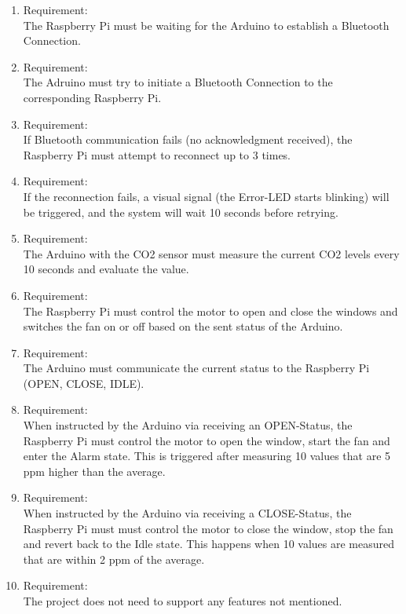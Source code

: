     \begin{enumerate}[label*=\arabic*.]
        \item \label{qreq.1}  Requirement:  \\
        The Raspberry Pi must be waiting for the Arduino to establish a Bluetooth Connection. \\ 
        \item \label{qreq.2}  Requirement:  \\
        The Adruino must try to initiate a Bluetooth Connection to the corresponding Raspberry Pi. \\ 
        \item \label{qreq.3}  Requirement:  \\
        If Bluetooth communication fails (no acknowledgment received), the Raspberry Pi must attempt to reconnect up to 3 times. \\ 
        \item \label{qreq.4}  Requirement:  \\
        If the reconnection fails, a visual signal (the Error-LED starts blinking) will be triggered, and the system will wait 10 seconds before retrying. \\
        \item \label{qreq.5}  Requirement:  \\
        The Arduino with the CO2 sensor must measure the current CO2 levels every 10 seconds and evaluate the value. \\ 
        \item \label{qreq.6}  Requirement:  \\
        The Raspberry Pi must control the motor to open and close the windows and switches the fan on or off based on the sent status of the Arduino.\\ 
        \item \label{qreq.7}  Requirement:  \\
        The Arduino must communicate the current status to the Raspberry Pi (OPEN, CLOSE, IDLE).\\ 
        \item \label{qreq.8}  Requirement:  \\
        When instructed by the Arduino via receiving an OPEN-Status, the Raspberry Pi must control the motor to open the window, start the fan and enter the Alarm state. This is triggered after measuring 10 values that are 5 ppm higher than the average.\\ 
        \item \label{qreq.9}  Requirement:  \\
        When instructed by the Arduino via receiving a CLOSE-Status, the Raspberry Pi must must control the motor to close the window, stop the fan and revert back to the Idle state. This happens when 10 values are measured that are within 2 ppm of the average. \\ 
        \item \label{qreq.10}  Requirement:  \\
        The project does not need to support any features not mentioned. \\
        
    \end{enumerate} 
    
